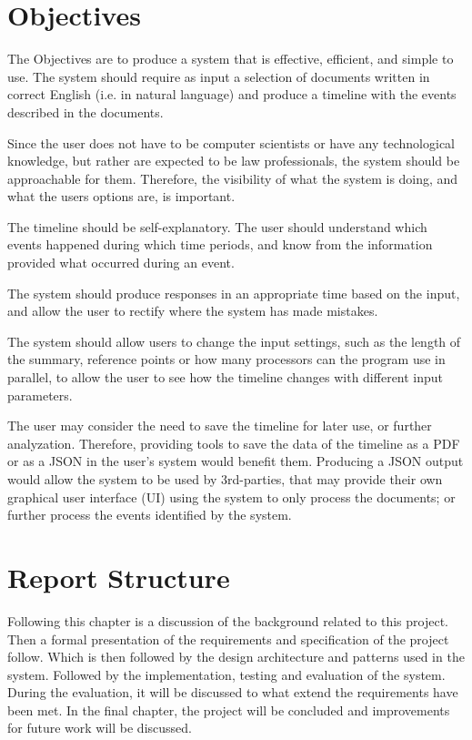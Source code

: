 \documentclass[11pt]{informatics-report}
\begin{document}
\section{Objectives}
\par The Objectives are to produce a system that is effective, efficient, and simple to use. The system should require as input a selection of documents written in correct English (i.e. in natural language) and produce a timeline with the events described in the documents.
\par Since the user does not have to be computer scientists or have any technological knowledge, but rather are expected to be law professionals, the system should be approachable for them. Therefore, the visibility of what the system is doing, and what the users options are, is important. 
\par The timeline should be self-explanatory. The user should understand which events happened during which time periods, and know from the information provided what occurred during an event. 
\par The system should produce responses in an appropriate time based on the input, and allow the user to rectify where the system has made mistakes. 
\par The system should allow users to change the input settings, such as the length of the summary, reference points or how many processors can the program use in parallel, to allow the user to see how the timeline changes with different input parameters.
\par The user may consider the need to save the timeline for later use, or further analyzation. Therefore, providing tools to save the data of the timeline as a PDF or as a JSON in the user's system would benefit them. Producing a JSON output would allow the system to be used by 3rd-parties, that may provide their own graphical user interface (UI) using the system to only process the documents; or further process the events identified by the system.
\section{Report Structure}
\par Following this chapter is a discussion of the background related to this project. Then a formal presentation of the requirements and specification of the project follow. Which is then followed by the design architecture and patterns used in the system. Followed by the implementation, testing and evaluation of the system. During the evaluation, it will be discussed to what extend the requirements have been met. In the final chapter, the project will be concluded and improvements for future work will be discussed.
\end{document}
